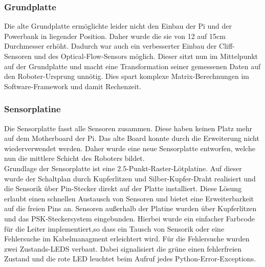 \documentclass[twoside,11pt, a4paper]{report}
\begin{document}
	
	\subsubsection{Grundplatte}
	Die alte Grundplatte ermöglichte leider nicht den Einbau der Pi und der Powerbank in liegender Position. Daher wurde die sie von 12 auf 15cm Durchmesser erhöht. Dadurch war auch ein verbesserter Einbau der Cliff-Sensoren und des Optical-Flow-Sensors möglich. Dieser sitzt nun im Mittelpunkt auf der Grundplatte und macht eine Transformation seiner gemessenen Daten auf den Roboter-Ursprung unnötig. Dies spart komplexe Matrix-Berechnungen im Software-Framework und damit Rechenzeit. 
	
	\subsubsection{Sensorplatine}
	Die Sensorplatte fasst alle Sensoren zusammen. Diese haben keinen Platz mehr auf dem Motherboard der Pi. Das alte Board konnte durch die Erweiterung nicht wiederverwendet werden. Daher wurde eine neue Sensorplatte entworfen, welche nun die mittlere Schicht des Roboters bildet. \\
	Grundlage der Sensorplatte ist eine 2.5-Punkt-Raster-Lötplatine. Auf dieser wurde der Schaltplan durch Kupferlitzen und Silber-Kupfer-Draht realisiert und die Sensorik über Pin-Stecker direkt auf der Platte installiert. Diese Lösung erlaubt einen schnellen Austausch von Sensoren und bietet eine Erweiterbarkeit auf die freien Pins an. Sensoren außerhalb der Platine wurden über Kupferlitzen und das PSK-Steckersystem eingebunden. Hierbei wurde ein einfacher Farbcode für die Leiter implementiert,so dass ein Tausch von Sensorik oder eine Fehlersuche im Kabelmanagment erleichtert wird. Für die Fehlersuche wurden zwei Zustands-LEDS verbaut. Dabei signalisiert die grüne einen fehlerfreien Zustand und die rote LED leuchtet beim Aufruf jedes Python-Error-Exceptions. 
\end{document}
